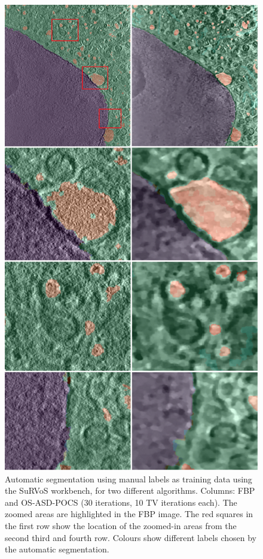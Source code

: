\begin{figure}
\begin{center}

\includegraphics[height=0.8\textheight]{Applications/survos.png} 

\end{center}

\caption[Cell images segmented using SuRVoS for FBP and TV]{\label{fig:survos} Automatic segmentation using manual labels as training data using the SuRVoS workbench, for two different algorithms. Columns: FBP and OS-ASD-POCS (30 iterations, 10 TV iterations each). The zoomed areas are highlighted in the FBP image. The red squares in the first row show the location of the zoomed-in areas from the second third and fourth row. Colours show different labels chosen by the automatic segmentation.} 
\end{figure}
\FloatBarrier
